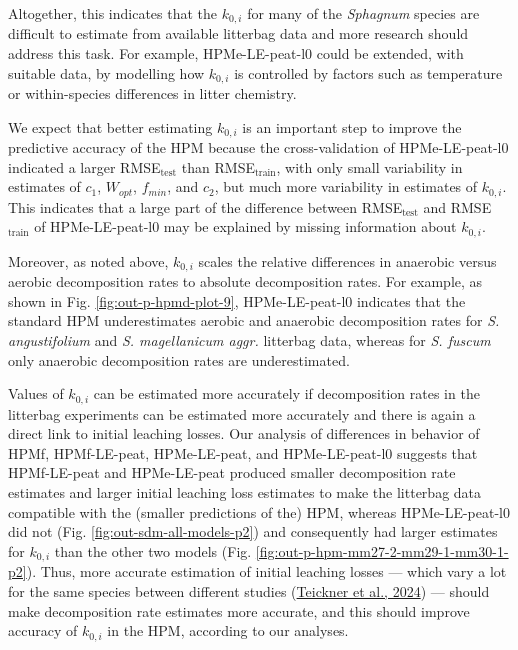 \documentclass[
  12pt,
]{article}
\begin{document}
Altogether, this indicates that the \(k_{0,i}\) for many of the \emph{Sphagnum} species are difficult to estimate from available litterbag data and more research should address this task. For example, HPMe-LE-peat-l0 could be extended, with suitable data, by modelling how \(k_{0,i}\) is controlled by factors such as temperature or within-species differences in litter chemistry.

We expect that better estimating \(k_{0,i}\) is an important step to improve the predictive accuracy of the HPM because the cross-validation of HPMe-LE-peat-l0 indicated a larger RMSE\(_\text{test}\) than RMSE\(_\text{train}\), with only small variability in estimates of \(c_1\), \(W_{opt}\), \(f_{min}\), and \(c_2\), but much more variability in estimates of \(k_{0,i}\). This indicates that a large part of the difference between RMSE\(_\text{test}\) and RMSE\(_\text{train}\) of HPMe-LE-peat-l0 may be explained by missing information about \(k_{0,i}\).

Moreover, as noted above, \(k_{0,i}\) scales the relative differences in anaerobic versus aerobic decomposition rates to absolute decomposition rates. For example, as shown in Fig. \ref{fig:out-p-hpmd-plot-9}, HPMe-LE-peat-l0 indicates that the standard HPM underestimates aerobic and anaerobic decomposition rates for \emph{S. angustifolium} and \emph{S. magellanicum aggr.} litterbag data, whereas for \emph{S. fuscum} only anaerobic decomposition rates are underestimated.

Values of \(k_{0,i}\) can be estimated more accurately if decomposition rates in the litterbag experiments can be estimated more accurately and there is again a direct link to initial leaching losses. Our analysis of differences in behavior of HPMf, HPMf-LE-peat, HPMe-LE-peat, and HPMe-LE-peat-l0 suggests that HPMf-LE-peat and HPMe-LE-peat produced smaller decomposition rate estimates and larger initial leaching loss estimates to make the litterbag data compatible with the (smaller predictions of the) HPM, whereas HPMe-LE-peat-l0 did not (Fig. \ref{fig:out-sdm-all-models-p2}) and consequently had larger estimates for \(k_{0,i}\) than the other two models (Fig. \ref{fig:out-p-hpm-mm27-2-mm29-1-mm30-1-p2}). Thus, more accurate estimation of initial leaching losses --- which vary a lot for the same species between different studies (\protect\hyperlink{ref-Teickner.2024}{Teickner et al., 2024}) --- should make decomposition rate estimates more accurate, and this should improve accuracy of \(k_{0,i}\) in the HPM, according to our analyses.
\end{document}
